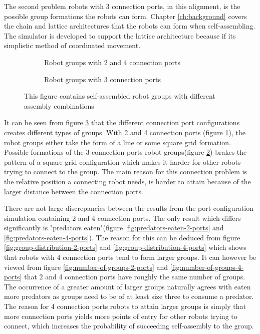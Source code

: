 The second problem robots with 3 connection ports, in this alignment, is the possible group formations the robots can form.
Chapter \ref{ch:background} covers the chain and lattice architectures that the robots can form when self-assembling. %
The simulator is developed to support the lattice architecture because if its simplistic method of coordinated movement.

\begin{figure}[H]
	\begin{subfigure}[t]{0.49\textwidth}
		\centering
		\caption{Robot groups with 2 and 4 connection ports}
		\label{2-4-port-architecture}
	\end{subfigure}
	\begin{subfigure}[t]{0.49\textwidth}
		\centering
		\caption{Robot groups with 3 connection ports}
		\label{3-port-architecture}
	\end{subfigure}
	\caption{This figure contains self-assembled robot groups with different assembly combinations}
	\label{port-architectures}
\end{figure}

It can be seen from figure \ref{port-architectures} that the different connection port configurations creates different types of groups. 
With 2 and 4 connection ports (figure \ref{2-4-port-architecture}), the robot groups either take the form of a line or some square grid formation.
Possible formations of the 3 connection ports robot groups(figure \ref{3-port-architecture}) brakes the pattern of a square grid configuration which makes it harder for other robots trying to connect to the group.
The main reason for this connection problem is the relative position a connecting robot needs, is harder to attain because of the larger distance between the connection ports.

There are not large discrepancies between the results from the port configuration simulation containing 2 and 4 connection ports.
The only result which differs significantly is "predators eaten"(figure \ref{fig:predators-eaten-2-ports} and \ref{fig:predators-eaten-4-ports}).
The reason for this can be deduced from figure \ref{fig:group-distribution-2-ports} and \ref{fig:group-distribution-4-ports} which shows that robots with 4 connection ports tend to form larger groups.
It can however be viewed from figure \ref{fig:number-of-groups-2-ports} and \ref{fig:number-of-groups-4-ports} that 2 and 4 connection ports have roughly the same number of groups.
The occurrence of a greater amount of larger groups naturally agrees with eaten more predators as groups need to be of at least size three to consume a predator.
The reason for 4 connection ports robots to attain larger groups is simply that more connection ports yields more points of entry for other robots trying to connect, which increases the probability of succeeding self-assembly to the group.

